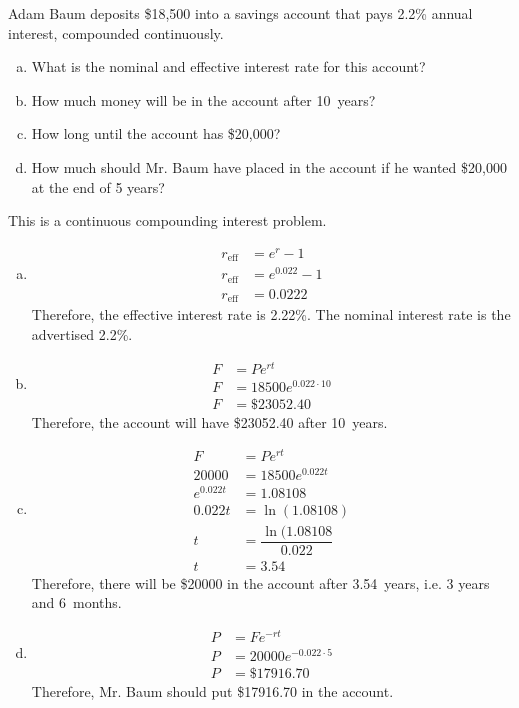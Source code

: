 \documentclass[11pt,letterpaper]{article}
\begin{document}
\newpage





 Adam Baum deposits \$18,500 into a savings account that pays 2.2\% annual interest, compounded continuously. 
\begin{enumerate}[(a)]
\item What is the nominal and effective interest rate for this account?
\item How much money will be in the account after 10~years?
\item How long until the account has \$20,000? 
\item How much should Mr. Baum have placed in the account if he wanted \$20,000 at the end of 5 years? 
\end{enumerate} \pspace

\sol This is a continuous compounding interest problem.
\begin{enumerate}[(a)]
\item 
	\[
	\begin{aligned}
	r_{\text{eff}}&= e^r - 1 \\
	r_{\text{eff}}&= e^{0.022} - 1 \\
	r_{\text{eff}}&= 0.0222
	\end{aligned}
	\]
Therefore, the effective interest rate is 2.22\%. The nominal interest rate is the advertised 2.2\%. \pspace

\item 
	\[
	\begin{aligned}
	F&= Pe^{rt} \\
	F&= 18500 e^{0.022 \cdot 10} \\
	F&= \$23052.40
	\end{aligned}
	\]
Therefore, the account will have \$23052.40 after 10~years. \pspace

\item 
	\[
	\begin{aligned}
	F&= Pe^{rt} \\
	20000&= 18500 e^{0.022 t} \\
	e^{0.022t}&= 1.08108 \\
	0.022t&= \ln(1.08108) \\
	t&= \dfrac{\ln(1.08108}{0.022} \\
	t&= 3.54
	\end{aligned}
	\]
Therefore, there will be \$20000 in the account after 3.54~years, i.e. 3 years and 6~months. \pspace

\item 
	\[
	\begin{aligned}
	P&= Fe^{-rt} \\
	P&= 20000 e^{-0.022 \cdot 5} \\
	P&= \$17916.70
	\end{aligned}
	\]
Therefore, Mr. Baum should put \$17916.70 in the account. 
\end{enumerate}
\end{document}
